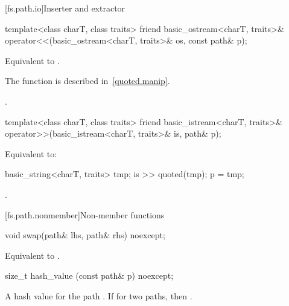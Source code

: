 [fs.path.io]{Inserter and extractor}

%
\begin{itemdecl}
template<class charT, class traits>
  friend basic_ostream<charT, traits>&
    operator<<(basic_ostream<charT, traits>& os, const path& p);
\end{itemdecl}

\begin{itemdescr}
\pnum
\effects
Equivalent to .
\begin{note}
The  function is described in~\ref{quoted.manip}.
\end{note}

\pnum
\returns
{}.
\end{itemdescr}

%
\begin{itemdecl}
template<class charT, class traits>
  friend basic_istream<charT, traits>&
    operator>>(basic_istream<charT, traits>& is, path& p);
\end{itemdecl}

\begin{itemdescr}
\pnum
\effects
Equivalent to:
\begin{codeblock}
basic_string<charT, traits> tmp;
is >> quoted(tmp);
p = tmp;
\end{codeblock}

\pnum
\returns
{}.
\end{itemdescr}

[fs.path.nonmember]{Non-member functions}

%
\begin{itemdecl}
void swap(path& lhs, path& rhs) noexcept;
\end{itemdecl}

\begin{itemdescr}
\pnum
\effects
Equivalent to .
\end{itemdescr}

%
\begin{itemdecl}
size_t hash_value (const path& p) noexcept;
\end{itemdecl}

\begin{itemdescr}
\pnum
\returns
A hash value for the path . If
  for two paths,  then .
\end{itemdescr}

